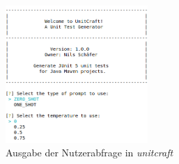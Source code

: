 \begin{figure}[h]
    \centering
    \includegraphics[width=0.48\textwidth]{Assets/Images/user.png}
    \caption{Ausgabe der Nutzerabfrage in \textit{unitcraft}}
    \label{fig:user}
\end{figure}